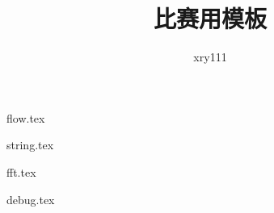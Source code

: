 \documentclass{article}
\title{比赛用模板}
\author{xry111}
\begin{document}
\maketitle

\tableofcontents

{flow.tex}


{string.tex}

{fft.tex}




\graphicspath{{./debug/}}
{debug.tex}
\end{document}

